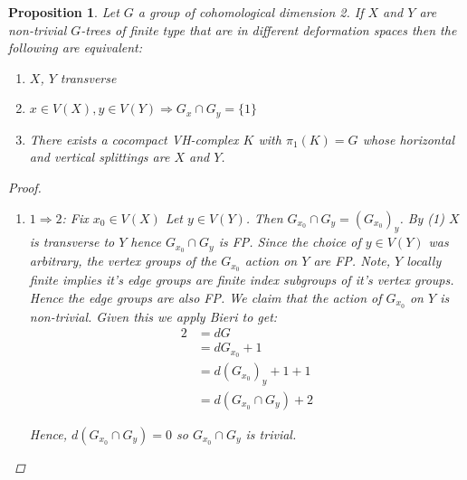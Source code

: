 \documentclass{article}
\theoremstyle{mystyle}
\newtheorem{pro}{Proposition}
\theoremstyle{remark}
\begin{document}
\begin{pro}
 Let $G$ a group of cohomological dimension 2. If $X$ and $Y$ are non-trivial $G$-trees of finite type that are in different deformation spaces then the following are equivalent:
\begin{enumerate}
    \item $X$, $Y$ transverse
    \item $x \in V(X), y\in V(Y)\Longrightarrow G_x\cap G_y = \{1\}$
    \item There exists a cocompact VH-complex $K$ with $\pi_1(K) = G$ whose horizontal and vertical splittings are $X$ and $Y$.
\end{enumerate}
\begin{proof}
\begin{enumerate}
    \item $1\Rightarrow 2$: Fix $x_0 \in V(X)$ Let $y\in V(Y)$. Then $G_{x_0} \cap G_y = (G_{x_0})_y$. By (1) $X$ is transverse to $Y$ hence $G_{x_0}\cap G_y$ is FP. Since the choice of $y\in V(Y)$ was arbitrary, the vertex groups of the $G_{x_0}$ action on $Y$ are FP. Note, $Y$ locally finite implies it's edge groups are finite index subgroups of it's vertex groups. Hence the edge groups are also FP. We claim that the action of $G_{x_0}$ on $Y$ is non-trivial. Given this we apply Bieri to get:
    \begin{align*}
        2 &= dG\\
          &= dG_{x_0}+1\\
          &= d( G_{x_0} )_y+1+1\\
          &= d(G_{x_0}\cap G_y)+2
    \end{align*}
    
    Hence, $d(G_{x_0}\cap G_y)=0$ so $G_{x_0}\cap G_y$ is trivial.
    

\end{enumerate}
\end{proof}
\end{pro}
\end{document}
